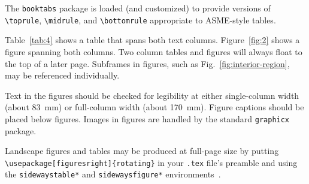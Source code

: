 \documentclass[subscriptcorrection,upint,varvw,mathalfa=cal=euler,barcolor=black,balance,hyphenate,french,pdf-a,nolists]{asmejour}
\begin{document}
The \texttt{booktabs} package \cite{fear} is loaded (and customized) to provide versions of \verb|\toprule|, \verb|\midrule|, and \verb|\bottomrule| appropriate to ASME-style tables.

Table~\ref{tab:4} shows a table that spans both text columns. Figure~\ref{fig:2} shows a figure spanning both columns. Two column tables and figures will always float to the top of a later page. Subframes in figures, such as  Fig.~\ref{fig:interior-region}, may be referenced individually.

Text in the figures should be checked for legibility at either single-column width (about 83~mm) or full-column width (about 170~mm).  Figure captions should be placed below figures. Images in figures are handled by the standard \texttt{graphicx} package.

Landscape figures and tables may be produced at full-page size by putting \verb|\usepackage[figuresright]{rotating}| in your \texttt{.tex} file's preamble and using the \texttt{sidewaystable*} and \texttt{sidewaysfigure*} environments~\cite{fairbairns}.


\end{document}
